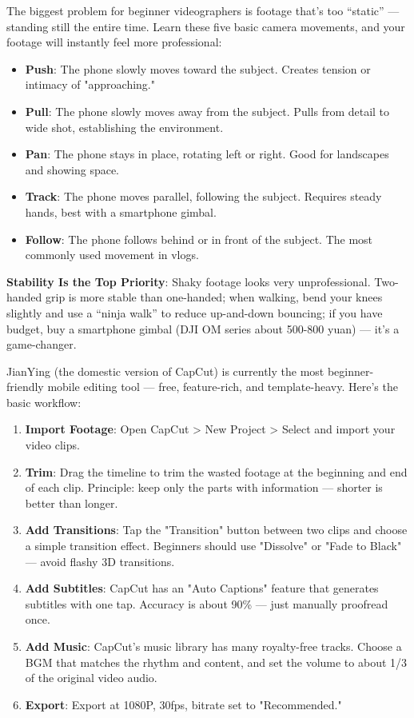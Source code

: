 
The biggest problem for beginner videographers is footage that's too “static” — standing still the entire time. Learn these five basic camera movements, and your footage will instantly feel more professional:

\begin{itemize}
  \item \textbf{Push}: The phone slowly moves toward the subject. Creates tension or intimacy of "approaching."
  \item \textbf{Pull}: The phone slowly moves away from the subject. Pulls from detail to wide shot, establishing the environment.
  \item \textbf{Pan}: The phone stays in place, rotating left or right. Good for landscapes and showing space.
  \item \textbf{Track}: The phone moves parallel, following the subject. Requires steady hands, best with a smartphone gimbal.
  \item \textbf{Follow}: The phone follows behind or in front of the subject. The most commonly used movement in vlogs.
\end{itemize}

\textbf{Stability Is the Top Priority}: Shaky footage looks very unprofessional. Two-handed grip is more stable than one-handed; when walking, bend your knees slightly and use a “ninja walk” to reduce up-and-down bouncing; if you have budget, buy a smartphone gimbal (DJI OM series about 500-800 yuan) — it's a game-changer.


JianYing (the domestic version of CapCut) is currently the most beginner-friendly mobile editing tool — free, feature-rich, and template-heavy. Here's the basic workflow:

\begin{enumerate}
  \item \textbf{Import Footage}: Open CapCut > New Project > Select and import your video clips.
  \item \textbf{Trim}: Drag the timeline to trim the wasted footage at the beginning and end of each clip. Principle: keep only the parts with information — shorter is better than longer.
  \item \textbf{Add Transitions}: Tap the "Transition" button between two clips and choose a simple transition effect. Beginners should use "Dissolve" or "Fade to Black" — avoid flashy 3D transitions.
  \item \textbf{Add Subtitles}: CapCut has an "Auto Captions" feature that generates subtitles with one tap. Accuracy is about 90\% — just manually proofread once.
  \item \textbf{Add Music}: CapCut's music library has many royalty-free tracks. Choose a BGM that matches the rhythm and content, and set the volume to about 1/3 of the original video audio.
  \item \textbf{Export}: Export at 1080P, 30fps, bitrate set to "Recommended."
\end{enumerate}

